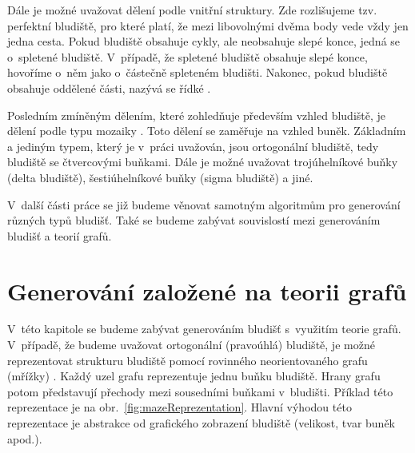 \documentclass[a4paper,12pt]{article}
\begin{document}
Dále je možné uvažovat dělení podle vnitřní struktury. Zde rozlišujeme tzv. perfektní bludiště, pro které platí, že
mezi libovolnými dvěma body vede vždy jen jedna cesta. Pokud bludiště obsahuje cykly, ale neobsahuje slepé konce, jedná
se o~spletené bludiště. V~případě, že spletené bludiště obsahuje slepé konce, hovoříme o~něm jako o~částečně spleteném bludišti.
Nakonec, pokud bludiště obsahuje oddělené části, nazývá se řídké \cite{pul:lab}.

Posledním zmíněným dělením, které zohledňuje především vzhled bludiště, je dělení podle typu mozaiky \cite{pul:lab}.
Toto dělení se zaměřuje na vzhled buněk. Základním a jediným typem, který je v~práci uvažován, jsou
ortogonální bludiště, tedy bludiště se čtvercovými buňkami. Dále je možné uvažovat trojúhelníkové buňky (delta bludiště),
šestiúhelníkové buňky (sigma bludiště) a jiné.

V~další části práce se již budeme věnovat samotným algoritmům pro generování různých typů bludišť.
Také se budeme zabývat souvislostí mezi generováním bludišť a teorií grafů.

\section{Generování založené na teorii grafů}
V~této kapitole se budeme zabývat generováním bludišť s~využitím teorie grafů.
V~případě, že budeme uvažovat ortogonální (pravoúhlá) bludiště, je možné reprezentovat strukturu bludiště pomocí rovinného
neorientovaného grafu (mřížky) \cite{mat}. Každý uzel grafu reprezentuje jednu buňku bludiště. Hrany grafu potom představují přechody
mezi sousedními buňkami v~bludišti. Příklad této reprezentace je na obr.~\ref{fig:mazeReprezentation}. Hlavní výhodou 
této reprezentace je abstrakce od grafického zobrazení bludiště (velikost, tvar buněk apod.). 
\end{document}
